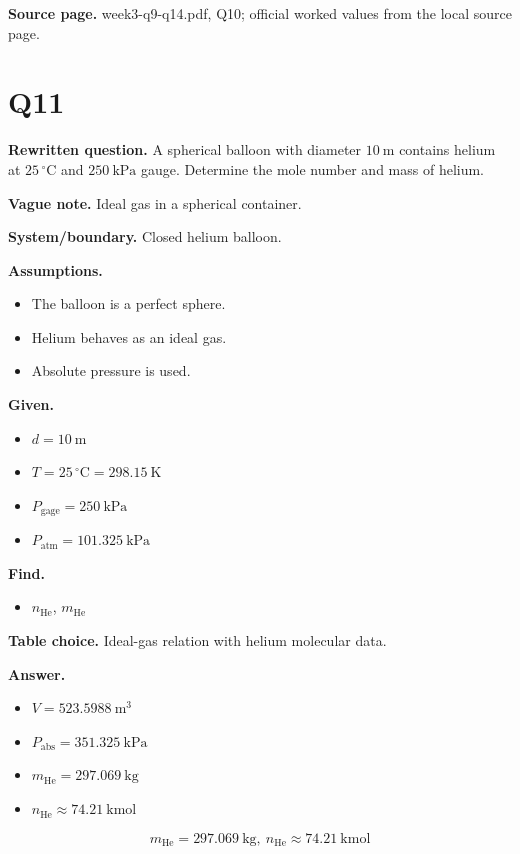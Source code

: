 \textbf{Source page.} week3-q9-q14.pdf, Q10; official worked values from the local source page.

\section*{Q11}
\textbf{Rewritten question.} A spherical balloon with diameter $10\ \mathrm{m}$ contains helium at $25\,^{\circ}\mathrm{C}$ and $250\ \mathrm{kPa}$ gauge. Determine the mole number and mass of helium.

\textbf{Vague note.} Ideal gas in a spherical container.

\textbf{System/boundary.} Closed helium balloon.

\textbf{Assumptions.}
\begin{itemize}
  \item The balloon is a perfect sphere.
  \item Helium behaves as an ideal gas.
  \item Absolute pressure is used.
\end{itemize}

\textbf{Given.}
\begin{itemize}
  \item $d = 10\ \mathrm{m}$
  \item $T = 25\,^{\circ}\mathrm{C} = 298.15\ \mathrm{K}$
  \item $P_{\mathrm{gage}} = 250\ \mathrm{kPa}$
  \item $P_{\mathrm{atm}} = 101.325\ \mathrm{kPa}$
\end{itemize}

\textbf{Find.}
\begin{itemize}
  \item $n_{\mathrm{He}}$, $m_{\mathrm{He}}$
\end{itemize}

\textbf{Table choice.} Ideal-gas relation with helium molecular data.

\textbf{Answer.}
\begin{itemize}
  \item $V = 523.5988\ \mathrm{m^3}$
  \item $P_{\mathrm{abs}} = 351.325\ \mathrm{kPa}$
  \item $m_{\mathrm{He}} = 297.069\ \mathrm{kg}$
  \item $n_{\mathrm{He}} \approx 74.21\ \mathrm{kmol}$
\end{itemize}

\[\boxed{m_{\mathrm{He}} = 297.069\ \mathrm{kg},\ n_{\mathrm{He}} \approx 74.21\ \mathrm{kmol}}\]

